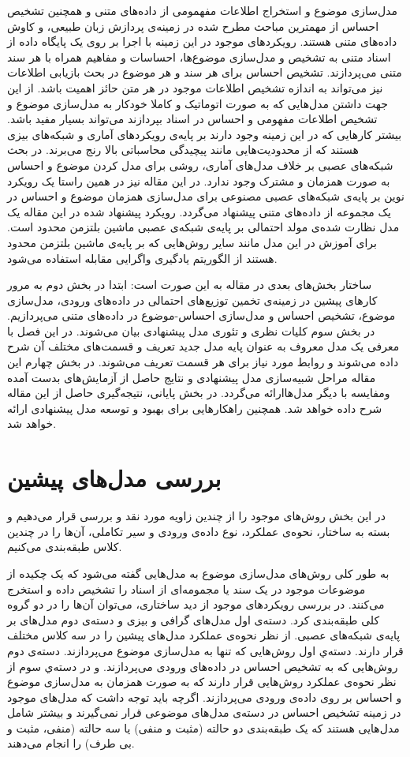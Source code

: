 \documentclass[12pt,a4paper]{article}
\begin{document}
مدل‌سازی موضوع و استخراج اطلاعات مفهمومی از داده‌های متنی و همچنین تشخیص احساس از مهمترین مباحث مطرح شده در زمینه‌ی پردازش زبان طبیعی، و کاوش داده‌های متنی هستند. رویکردهای موجود در این زمینه با اجرا بر روی یک پایگاه داده‌ از اسناد متنی به تشخیص و مدل‌سازی موضوع‌ها، احساسات و مفاهیم همراه با هر سند متنی می‌پردازند. تشخیص احساس برای هر سند و هر موضوع در بحث بازیابی اطلاعات نیز می‌‌تواند به اندازه تشخیص اطلاعات موجود در هر متن حائز اهمیت باشد. از این جهت داشتن مدل‌هایی که به صورت اتوماتیک و کاملا خودکار به مدل‌سازی موضوع و تشخیص اطلاعات مفهومی‌ و احساس در اسناد بپردازند می‌تواند بسیار مفید باشد. بیشتر کارهایی که در این زمینه وجود دارند بر پایه‌ی رویکردهای آماری و شبکه‌های بیزی هستند که از محدودیت‌هایی مانند پیچیدگی محاسباتی بالا رنج می‌برند. در بحث شبکه‌های عصبی بر خلاف مدل‌های آماری، روشی برای مدل کردن موضوع و احساس به صورت همزمان و مشترک وجود ندارد. در این مقاله نیز در همین راستا یک رویکرد نوین‌ بر پایه‌ی شبکه‌های عصبی مصنوعی برای مدل‌سازی همزمان موضوع‌ و احساس‌ در یک مجموعه از داده‌های متنی پیشنهاد می‌گردد. رویکرد پیشنهاد شده در این مقاله یک مدل نظارت شده‌ی مولد احتمالی‌ بر پایه‌ی شبکه‌ی عصبی ماشین بلتزمن محدود است. برای آموزش در این مدل مانند سایر روش‌هایی که بر پایه‌ی ماشین بلتزمن محدود هستند از الگوریتم یادگیری واگرایی مقابله استفاده می‌‌شود.

ساختار بخش‌های بعدی در مقاله به این صورت است: ابتدا در بخش دوم به مرور کارهای پیشین در زمینه‌ی تخمین توزیع‌های احتمالی‌ در داده‌های ورودی، مدل‌سازی موضوع، تشخیص احساس و مدل‌سازی احساس‌-موضوع در داده‌های متنی می‌‌پردازیم. در بخش سوم کلیات نظری و تئوری مدل پیشنهادی بیان می‌‌شوند. در این فصل با معرفی‌ یک مدل معروف به عنوان پایه مدل جدید تعریف و قسمت‌های مختلف آن شرح داده می‌‌شوند و روابط مورد نیاز برای هر قسمت تعریف می‌‌شوند. در بخش چهارم این مقاله مراحل شبیه‌سازی مدل پیشنهادی و نتایج حاصل از آزمایش‌های بدست آمده ومفایسه با دیگر مدل‌هاارائه می‌گردد. در بخش پایانی، نتیجه‌گیری حاصل از این مقاله شرح داده خواهد شد. همچنین راهکارهایی برای بهبود و توسعه مدل پیشنهادی ارائه خواهد شد.

\section{ بررسی مدل‌های پیشین}
\label{sec2}
در این بخش روش‌های موجود را از چندین زاویه مورد نقد و بررسی‌ قرار می‌‌دهیم و بسته به ساختار، نحوه‌ی عملکرد، نوع داده‌ی ورودی و سیر تکاملی، آن‌ها را در چندین کلاس طبقه‌بندی می‌‌کنیم.

به طور کلی روش‌های مدل‌سازی موضوع به مدل‌هایی گفته می‌‌شود که یک چکیده از موضوعات موجود در یک سند یا مجمومه‌ای از اسناد را تشخیص داده و استخرج می‌‌کنند. در بررسی‌ رویکرد‌های موجود از دید ساختاری، می‌‌توان آن‌ها را در دو گروه کلی‌ طبقه‌بندی کرد. دسته‌ی اول مدل‌های گرافی‌ و بیزی و دسته‌ی دوم مدل‌های بر پایه‌ی شبکه‌های عصبی. از نظر نحوه‌ی عملکرد مدل‌های پیشین را در سه‌  کلاس مختلف قرار دارند. دسته‌ي اول روش‌هایی که تنها به مدل‌سازی موضوع می‌‌پردازند. دسته‌ی دوم روش‌هایی که به تشخیص احساس در داده‌های ورودی می‌‌پردازند. و در دسته‌‌ي سوم از نظر نحوه‌ی عملکرد روش‌هایی قرار دارند که به صورت همزمان به مدل‌سازی موضوع و احساس بر روی داده‌ی ورودی می‌‌پردازند. اگرچه باید توجه داشت که مدل‌های موجود در زمینه تشخیص احساس در دسته‌ی مدل‌های موضوعی قرار نمی‌‌گیرند و بیشتر شامل مدل‌هایی هستند که یک طبقه‌بندی دو حالته (مثبت و منفی‌) یا سه‌ حالته (منفی‌، مثبت و بی‌ طرف) را انجام می‌‌دهند. 
\end{document}
